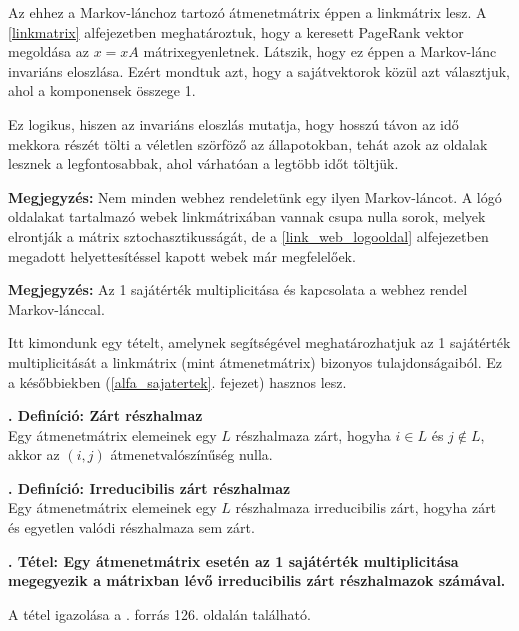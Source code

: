 \documentclass[12pt,a4paper]{article}
\newcounter{definicioszam}
\newenvironment{definicio}[1]
{{\medskip}\noindent \stepcounter{definicioszam}
{\bfseries{\thedefinicioszam. Definíció: #1\\[1ex]}}}{\bigskip }
\newcounter{tszam}
\newenvironment{tetel}[1]
{{\medskip}\noindent \stepcounter{tszam}
{\bfseries{\thetszam. Tétel: #1\\[1ex]}}}{\bigskip }
\begin{document}
Az ehhez a Markov-lánchoz tartozó átmenetmátrix éppen a linkmátrix lesz. A \ref{linkmatrix} alfejezetben meghatároztuk, hogy a keresett PageRank vektor megoldása az $x = xA$ mátrixegyenletnek. Látszik, hogy ez éppen a Markov-lánc invariáns eloszlása. Ezért mondtuk azt, hogy a sajátvektorok közül azt választjuk, ahol a komponensek összege 1.

Ez logikus, hiszen az invariáns eloszlás mutatja, hogy hosszú távon az idő mekkora részét tölti a véletlen szörföző az állapotokban, tehát azok az oldalak lesznek a legfontosabbak, ahol várhatóan a legtöbb időt töltjük.

\vspace{0.1cm}
\textbf{Megjegyzés:} Nem minden webhez rendeletünk egy ilyen Markov-láncot. A lógó oldalakat tartalmazó webek linkmátrixában vannak csupa nulla sorok, melyek elrontják a mátrix sztochasztikusságát, de a \ref{link_web_logooldal} alfejezetben megadott helyettesítéssel kapott webek már megfelelőek. 
\vspace{0.1cm}

\vspace{0.1cm}
\textbf{Megjegyzés:} Az 1 sajátérték multiplicitása és kapcsolata a webhez rendel Markov-lánccal.
\vspace{0.1cm}

Itt kimondunk egy tételt, amelynek segítségével meghatározhatjuk az 1 sajátérték multiplicitását a linkmátrix (mint átmenetmátrix) bizonyos tulajdonságaiból. Ez a későbbiekben (\ref{alfa_sajatertek}. fejezet) hasznos lesz. 

\begin{definicio}{Zárt részhalmaz}
	Egy átmenetmátrix elemeinek egy $L$ részhalmaza zárt, hogyha $i \in L$ és $j \notin L$, akkor az $(i,j)$ átmenetvalószínűség nulla.  
\end{definicio}

\begin{definicio}{Irreducibilis zárt részhalmaz}
	Egy átmenetmátrix elemeinek egy $L$ részhalmaza irreducibilis zárt, hogyha zárt és egyetlen valódi részhalmaza sem zárt.
\end{definicio}

\begin{tetel}
	{Egy átmenetmátrix esetén az 1 sajátérték multiplicitása megegyezik a mátrixban lévő irreducibilis zárt részhalmazok számával.}
\end{tetel}

A tétel igazolása a \cite{irreducible_closed}. forrás 126. oldalán található.
\end{document}
